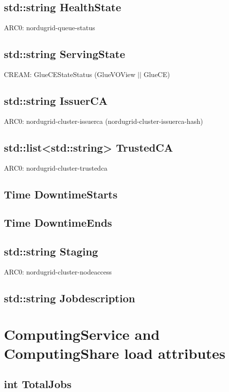 \documentclass{book}
\begin{document}
\subsection*{std::string HealthState}

ARC0: nordugrid-queue-status

\subsection*{std::string ServingState}

CREAM: GlueCEStateStatus (GlueVOView $||$ GlueCE)

\subsection*{std::string IssuerCA}

ARC0: nordugrid-cluster-issuerca (nordugrid-cluster-issuerca-hash)

\subsection*{std::list<std::string> TrustedCA}

ARC0: nordugrid-cluster-trustedca

\subsection*{Time DowntimeStarts}

\subsection*{Time DowntimeEnds}

\subsection*{std::string Staging}

ARC0: nordugrid-cluster-nodeaccess

\subsection*{std::string Jobdescription}

\section{ComputingService and ComputingShare load attributes}

\subsection*{int TotalJobs}
\end{document}
